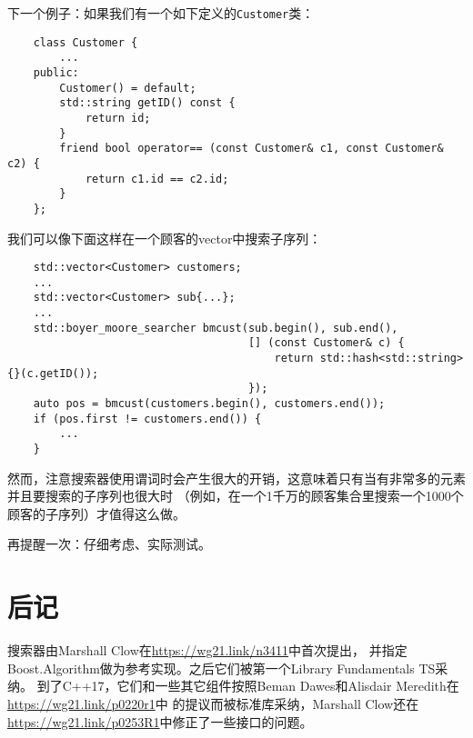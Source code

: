 下一个例子：如果我们有一个如下定义的\texttt{Customer}类：
\begin{lstlisting}
    class Customer {
        ...
    public:
        Customer() = default;
        std::string getID() const {
            return id;
        }
        friend bool operator== (const Customer& c1, const Customer& c2) {
            return c1.id == c2.id;
        }
    };
\end{lstlisting}
我们可以像下面这样在一个顾客的vector中搜索子序列：
\begin{lstlisting}
    std::vector<Customer> customers;
    ...
    std::vector<Customer> sub{...};
    ...
    std::boyer_moore_searcher bmcust(sub.begin(), sub.end(),
                                     [] (const Customer& c) {
                                         return std::hash<std::string>{}(c.getID());
                                     });
    auto pos = bmcust(customers.begin(), customers.end());
    if (pos.first != customers.end()) {
        ...
    }
\end{lstlisting}
然而，注意搜索器使用谓词时会产生很大的开销，这意味着只有当有非常多的元素并且要搜索的子序列也很大时
（例如，在一个1千万的顾客集合里搜索一个1000个顾客的子序列）才值得这么做。

再提醒一次：仔细考虑、实际测试。


\section{后记}
搜索器由Marshall Clow在\url{https://wg21.link/n3411}中首次提出，
并指定Boost.Algorithm做为参考实现。之后它们被第一个Library Fundamentals TS采纳。
到了C++17，它们和一些其它组件按照Beman Dawes和Alisdair Meredith在\url{https://wg21.link/p0220r1}中
的提议而被标准库采纳，Marshall Clow还在\url{https://wg21.link/p0253R1}中修正了一些接口的问题。